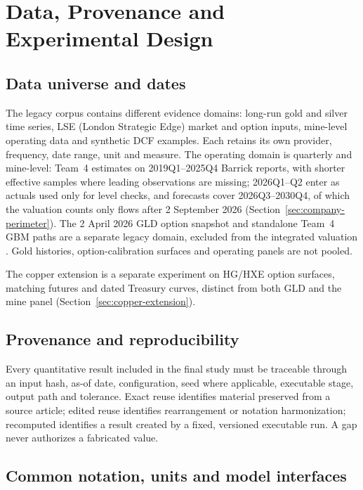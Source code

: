 \section{Data, Provenance and Experimental Design}
\label{sec:data-design}

\subsection{Data universe and dates}

The legacy corpus contains different evidence domains: long-run gold and silver
time series, LSE (London Strategic Edge) market and option inputs, mine-level
operating data and synthetic DCF examples. Each retains its own provider,
frequency, date range, unit and measure. The operating domain is quarterly and
mine-level: Team~4 estimates on 2019Q1--2025Q4 Barrick reports, with shorter
effective samples where leading observations are missing; 2026Q1--Q2 enter
as actuals used only for level checks, and forecasts cover 2026Q3--2030Q4, of
which the valuation counts only flows after 2 September 2026
(Section~\ref{sec:company-perimeter}). The 2 April 2026 GLD option snapshot
and standalone Team~4 GBM paths are a separate legacy domain, excluded from
the integrated valuation \cite{team4}. Gold histories, option-calibration
surfaces and operating panels are not pooled.

The copper extension is a separate experiment on HG/HXE option surfaces,
matching futures and dated Treasury curves, distinct from both GLD and the
mine panel (Section~\ref{sec:copper-extension}).

\subsection{Provenance and reproducibility}

Every quantitative result included in the final study must be traceable through an input hash, as-of date, configuration, seed where applicable, executable stage, output path and tolerance. Exact reuse identifies material preserved from a source article; edited reuse identifies rearrangement or notation harmonization; recomputed identifies a result created by a fixed, versioned executable run. A gap never authorizes a fabricated value.

\subsection{Common notation, units and model interfaces}


